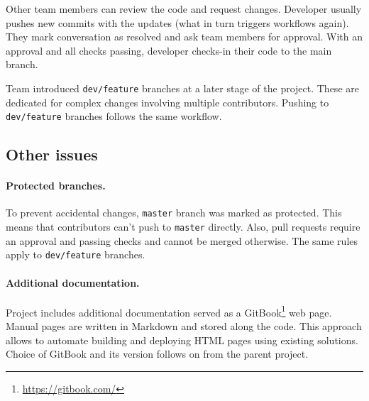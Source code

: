 Other team members can review the code and request changes.
Developer usually pushes new commits with the updates (what in turn triggers workflows again).
They mark conversation as resolved and ask team members for approval.
With an approval and all checks passing, developer checks-in their code to the main branch.

Team introduced \texttt{dev/feature} branches at a later stage of the project.
These are dedicated for complex changes involving multiple contributors.
Pushing to \texttt{dev/feature} branches follows the same workflow.

\subsection{Other issues}

\paragraph{Protected branches.}
To prevent accidental changes, \texttt{master} branch was marked as protected.
This means that contributors can't push to \texttt{master} directly.
Also, pull requests require an approval and passing checks and cannot be merged otherwise.
The same rules apply to \texttt{dev/feature} branches.

\paragraph{Additional documentation.}
Project includes additional documentation served as a GitBook\footnote{\href{https://gitbook.com/}{https://gitbook.com/}} web page.
Manual pages are written in Markdown and stored along the code.
This approach allows to automate building and deploying HTML pages using existing solutions.
Choice of GitBook and its version follows on from the parent project.
